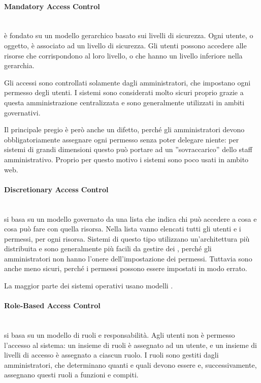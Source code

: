 \paragraph{Mandatory Access Control} \mbox{} \\
 è fondato su un modello gerarchico basato sui livelli di sicurezza. Ogni utente, o oggetto, è associato ad un livello di sicurezza. Gli utenti possono accedere alle risorse che corrispondono al loro livello, o che hanno un livello inferiore nella gerarchia.

Gli accessi sono controllati solamente dagli amministratori, che impostano ogni permesso degli utenti. I sistemi  sono considerati molto sicuri proprio grazie a questa amministrazione centralizzata e sono generalmente utilizzati in ambiti governativi.

Il principale pregio è però anche un difetto, perché gli amministratori devono obbligatoriamente assegnare ogni permesso senza poter delegare niente: per sistemi di grandi dimensioni questo può portare ad un ''sovraccarico'' dello staff amministrativo. Proprio per questo motivo i sistemi  sono poco usati in ambito web.

\paragraph{Discretionary Access Control} \mbox{} \\
 si basa su un modello governato da una lista che indica chi può accedere a cosa e cosa può fare con quella risorsa. Nella lista vanno elencati tutti gli utenti e i permessi, per ogni risorsa. Sistemi di questo tipo utilizzano un'architettura più distribuita e sono generalmente più facili da gestire dei , perché gli amministratori non hanno l'onere dell'impostazione dei permessi. Tuttavia sono anche meno sicuri, perché i permessi possono essere impostati in modo errato.

La maggior parte dei sistemi operativi usano modelli .

\paragraph{Role-Based Access Control} \mbox{} \\
 si basa su un modello di ruoli e responsabilità. Agli utenti non è permesso l'accesso al sistema: un insieme di ruoli è assegnato ad un utente, e un insieme di livelli di accesso è assegnato a ciascun ruolo. I ruoli sono gestiti dagli amministratori, che determinano quanti e quali devono essere e, successivamente, assegnano questi ruoli a funzioni e compiti. 

